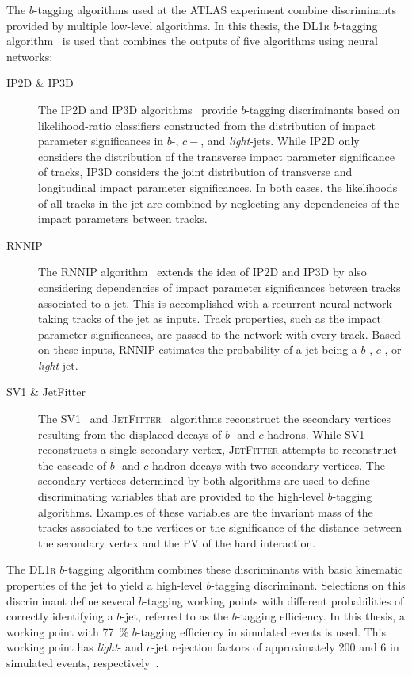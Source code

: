 The $b$-tagging algorithms used at the ATLAS experiment combine discriminants
provided by multiple low-level algorithms. In this thesis, the \textsc{DL1r}
$b$-tagging algorithm~\cite{FTAG-2019-07-001} is used that combines the outputs
of five algorithms using neural networks:
\begin{description}

\item[IP2D \& IP3D] The \textsc{IP2D} and \textsc{IP3D}
  algorithms~\cite{ATL-PHYS-PUB-2017-013} provide $b$-tagging discriminants
  based on likelihood-ratio classifiers constructed from the distribution of
  impact parameter significances in $b$-, $c-$, and \emph{light}-jets. While
  \textsc{IP2D} only considers the distribution of the transverse impact
  parameter significance of tracks, \textsc{IP3D} considers the joint
  distribution of transverse and longitudinal impact parameter significances.
  In both cases, the likelihoods of all tracks in the jet are combined by
  neglecting any dependencies of the impact parameters between tracks.

\item[RNNIP] The \textsc{RNNIP} algorithm~\cite{ATL-PHYS-PUB-2017-003} extends
  the idea of \textsc{IP2D} and \textsc{IP3D} by also considering dependencies
  of impact parameter significances between tracks associated to a jet. This is
  accomplished with a recurrent neural network taking tracks of the jet as
  inputs. Track properties, such as the impact parameter significances, are
  passed to the network with every track. Based on these inputs, \textsc{RNNIP}
  estimates the probability of a jet being a $b$-, $c$-, or \emph{light}-jet.

\item[SV1 \& JetFitter] The \textsc{SV1}~\cite{ATL-PHYS-PUB-2017-011} and
  \textsc{JetFitter}~\cite{ATL-PHYS-PUB-2018-025} algorithms reconstruct the
  secondary vertices resulting from the displaced decays of $b$- and
  $c$-hadrons. While \textsc{SV1} reconstructs a single secondary vertex,
  \textsc{JetFitter} attempts to reconstruct the cascade of $b$- and $c$-hadron
  decays with two secondary vertices. The secondary vertices determined by both
  algorithms are used to define discriminating variables that are provided to
  the high-level $b$-tagging algorithms. Examples of these variables are the
  invariant mass of the tracks associated to the vertices or the significance of
  the distance between the secondary vertex and the PV of the hard interaction.

\end{description}
The \textsc{DL1r} $b$-tagging algorithm combines these discriminants with basic
kinematic properties of the jet to yield a high-level $b$-tagging discriminant.
Selections on this discriminant define several $b$-tagging working points with
different probabilities of correctly identifying a $b$-jet, referred to as the
$b$-tagging efficiency. In this thesis, a working point with \SI{77}{\percent}
$b$-tagging efficiency in simulated \ttbar events is used.  This working point
has \emph{light}- and $c$-jet rejection factors of approximately 200 and 6 in
simulated \ttbar events, respectively~\cite{FTAG-2019-07-001}.

